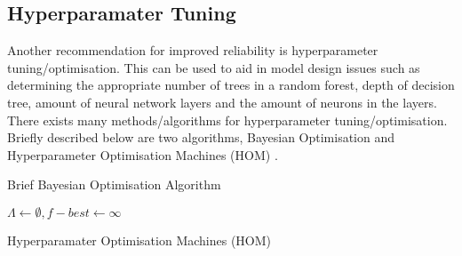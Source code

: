 \subsection{Hyperparamater Tuning}
Another recommendation for improved reliability is hyperparameter tuning/optimisation.
This can be used to aid in model design issues such as determining the appropriate number of trees in a random forest,
depth of decision tree, amount of neural network layers and the amount of neurons in the layers.
There exists many methods/algorithms for hyperparameter tuning/optimisation. 
Briefly described below are two algorithms, Bayesian Optimisation \cite{7900023} and Hyperparameter Optimisation Machines (HOM) \cite{7796889}.

\begin{algorithm}[H]
    \SetAlgoLined
    \caption{Brief Bayesian Optimisation Algorithm \cite{7900023}}
\end{algorithm}

\begin{algorithm}[H]
    \SetAlgoLined
    $\Lambda \leftarrow \emptyset, f-{best} \leftarrow \infty$\\

    
    \caption{Hyperparamater Optimisation Machines (HOM) \cite{7796889}}%
\end{algorithm}

